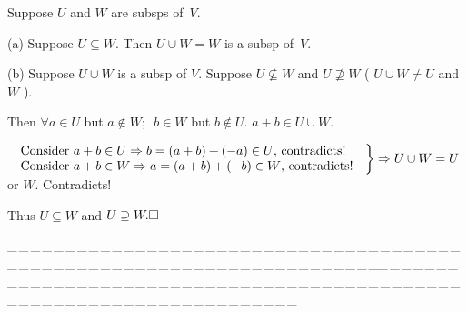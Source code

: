 \documentclass[a4paper, 11pt, UTF8]{article}
\def\Hb{\quad\hspace{8.7pt}}
\def\ProblemEnding{{\tiny \_\,\_\,\_\,\_\,\_\,\_\,\_\,\_\,\_\,\_\,\_\,\_\,\_\,\_\,\_\,\_\,\_\,\_\,\_\,\_\,\_\,\_\,\_\,\_\,\_\,\_\,\_\,\_\,\_\,\_\,\_\,\_\,\_\,\_\,\_\,\_\,\_\,\_\,\_\,\_\,\_\,\_\,\_\,\_\,\_\,\_\,\_\,\_\,\_\,\_\,\_\,\_\,\_\,\_\,\_\,\_\,\_\,\_\,\_\,\_\,\_\,\_\,\_\,\_\,\_\,\_\,\_\,\_\,\_\,\_\,\_\_\,\_\,\_\,\_\,\_\,\_\,\_\,\_\,\_\,\_\,\_\,\_\,\_\,\_\,\_\,\_\,\_\,\_\,\_\,\_\,\_\,\_\,\_\,\_\,\_\,\_\,\_\,\_\,\_\,\_\,\_\,\_\,\_\,\_\,\_\,\_\,\_\,\_\,\_\,\_\,\_\,\_\,\_\,\_\,\_\,\_\,\_\,\_\,\_\,\_\,\_\,\_\,\_\,\_\,\_\,\_\,\_\,\_\,\_\,\_\,\_\,\_\,\_\,\_\,\_\,\_\,\_\,\_\,\_\,\_\,\_}}
\begin{document}
\begin{large}
Suppose $U$ and $W$ are subsps of \,$V$.\par\quad
(a) Suppose $U\subseteq W$. Then $U\cup W=W$ is a subsp of \,$V$.\par\quad
(b) Suppose $U\cup W$ is a subsp of $V$. Suppose $U\not\subseteq W$ and $U\not\supseteq W$ ( $U\cup W\neq U$ and $W$ ).\par\quad\Hb
Then $\forall a\in U$ but $a\not\in W;\,\,\,b\in W$ but $b\not\in U.\,\,a+b\in U\cup W$.\par\vspace{6pt}\qquad
$\MathRightBrace{l}{$
Consider $a+b\in U\Rightarrow b=(a+b)+(-a)\in U$, contradicts!$\\ $
Consider $a+b\in W\Rightarrow a=(a+b)+(-b)\in W$, contradicts!
$}\Rightarrow U\cup W=U$ or $W.$ Contradicts!\par\vspace{6pt}\quad\Hb
Thus $U\subseteq W$ and $U\supseteq W.\hfill\square$\par
\ProblemEnding\par


\end{large}
\end{document}
